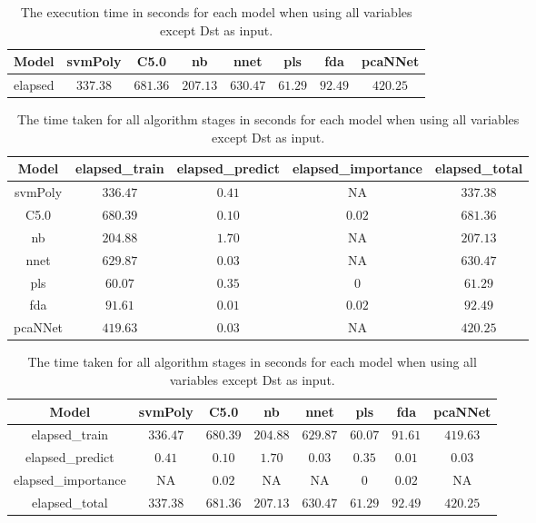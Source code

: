 \begin{table}[!ht]
	\centering
	\begin{tabular}{|c|c|c|c|c|c|c|c|}
		\hline
		Model & svmPoly & C5.0 & nb & nnet & pls & fda & pcaNNet \\ \hline
		elapsed & $337.38$ & $681.36$ & $207.13$ & $630.47$ & $61.29$ & $92.49$ & $420.25$ \\ \hline
	\end{tabular}
	\caption{The execution time in seconds for each model when using all variables except Dst as input.}
	\label{tab:time:reverse:noDst:total}
\end{table}

\begin{table}[!ht]
	\centering
	\begin{tabular}{|c|c|c|c|c|}
		\hline
		Model & elapsed_train & elapsed_predict & elapsed_importance & elapsed_total \\ \hline
		svmPoly & $336.47$ & $0.41$ & NA & $337.38$ \\ \hline
		C5.0 & $680.39$ & $0.10$ & $0.02$ & $681.36$ \\ \hline
		nb & $204.88$ & $1.70$ & NA & $207.13$ \\ \hline
		nnet & $629.87$ & $0.03$ & NA & $630.47$ \\ \hline
		pls & $60.07$ & $0.35$ & $0$ & $61.29$ \\ \hline
		fda & $91.61$ & $0.01$ & $0.02$ & $92.49$ \\ \hline
		pcaNNet & $419.63$ & $0.03$ & NA & $420.25$ \\ \hline
	\end{tabular}
	\caption{The time taken for all algorithm stages in seconds for each model when using all variables except Dst as input.}
	\label{tab:time:noDst}
\end{table}

\begin{table}[!ht]
	\centering
	\begin{tabular}{|c|c|c|c|c|c|c|c|}
		\hline
		Model & svmPoly & C5.0 & nb & nnet & pls & fda & pcaNNet \\ \hline
		elapsed_train & $336.47$ & $680.39$ & $204.88$ & $629.87$ & $60.07$ & $91.61$ & $419.63$ \\ \hline
		elapsed_predict & $0.41$ & $0.10$ & $1.70$ & $0.03$ & $0.35$ & $0.01$ & $0.03$ \\ \hline
		elapsed_importance & NA & $0.02$ & NA & NA & $0$ & $0.02$ & NA \\ \hline
		elapsed_total & $337.38$ & $681.36$ & $207.13$ & $630.47$ & $61.29$ & $92.49$ & $420.25$ \\ \hline
	\end{tabular}
	\caption{The time taken for all algorithm stages in seconds for each model when using all variables except Dst as input.}
	\label{tab:time:reverse:noDst}
\end{table}

